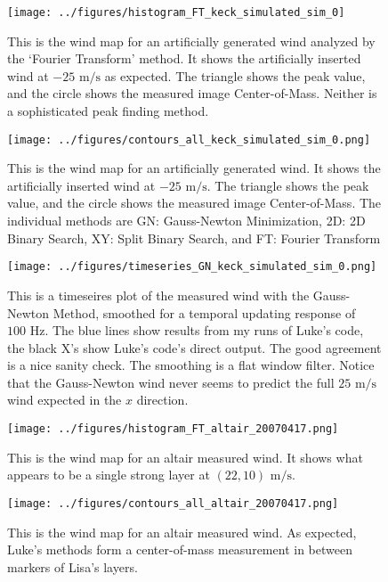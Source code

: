\documentclass[12pt]{article}
\title{\gotitle}
\author{\goauthor}
\date{\today}
\newcommand{\txt}{\textrm} %
\newcommand{\unit}[1]{\txt{ #1}} %
\begin{document}
\begin{figure}[htbp]
   \centering
   \texttt{[image: ../figures/histogram\_FT\_keck\_simulated\_sim\_0]} %
   \caption{This is the wind map for an artificially generated wind analyzed by the `Fourier Transform' method. It shows the artificially inserted wind at $-25 \unit{m/s}$ as expected. The triangle shows the peak value, and the circle shows the measured image Center-of-Mass. Neither is a sophisticated peak finding method.}
   \label{histogram_FT_keck_simulated_sim_0}
\end{figure}

\begin{figure}[htbp]
   \centering
   \texttt{[image: ../figures/contours\_all\_keck\_simulated\_sim\_0.png]} %
   \caption{This is the wind map for an artificially generated wind. It shows the artificially inserted wind at $-25 \unit{m/s}$. The triangle shows the peak value, and the circle shows the measured image Center-of-Mass. The individual methods are GN: Gauss-Newton Minimization, 2D: 2D Binary Search, XY: Split Binary Search, and FT: Fourier Transform}
   \label{contours_all_keck_simulated_sim_0}
\end{figure}


\begin{figure}[htbp]
   \centering
   \texttt{[image: ../figures/timeseries\_GN\_keck\_simulated\_sim\_0.png]} %
   \caption{This is a timeseires plot of the measured wind with the Gauss-Newton Method, smoothed for a temporal updating response of $100\unit{Hz}$. The blue lines show results from my runs of Luke's code, the black X's show Luke's code's direct output. The good agreement is a nice sanity check. The smoothing is a flat window filter. Notice that the Gauss-Newton wind never seems to predict the full $25 \unit{m/s}$ wind expected in the $x$ direction.}
   \label{timeseries_GN_keck_simulated_sim_0}
\end{figure}

\begin{figure}[htbp]
   \centering
   \texttt{[image: ../figures/histogram\_FT\_altair\_20070417.png]} %
   \caption{This is the wind map for an altair measured wind. It shows what appears to be a single strong layer at $\left(22,10\right)\unit{m/s}$.}
   \label{histogram_FT_altair_20070417}
\end{figure}

\begin{figure}[htbp]
   \centering
   \texttt{[image: ../figures/contours\_all\_altair\_20070417.png]} %
   \caption{This is the wind map for an altair measured wind. As expected, Luke's methods form a center-of-mass measurement in between markers of Lisa's layers.}
   \label{contours_all_altair_20070417}
\end{figure}
\end{document}
